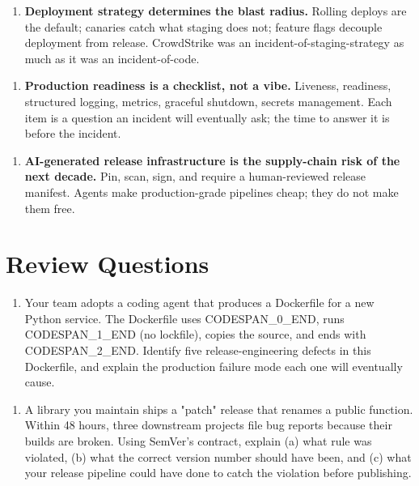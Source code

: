\documentclass[11pt,a4paper]{book}
\begin{document}
\begin{enumerate}
  \item \textbf{Deployment strategy determines the blast radius.} Rolling deploys are the default; canaries catch what staging does not; feature flags decouple deployment from release. CrowdStrike was an incident-of-staging-strategy as much as it was an incident-of-code.
\end{enumerate}

\begin{enumerate}
  \item \textbf{Production readiness is a checklist, not a vibe.} Liveness, readiness, structured logging, metrics, graceful shutdown, secrets management. Each item is a question an incident will eventually ask; the time to answer it is before the incident.
\end{enumerate}

\begin{enumerate}
  \item \textbf{AI-generated release infrastructure is the supply-chain risk of the next decade.} Pin, scan, sign, and require a human-reviewed release manifest. Agents make production-grade pipelines cheap; they do not make them free.
\end{enumerate}

\medskip

\section{Review Questions}

\begin{enumerate}
  \item Your team adopts a coding agent that produces a Dockerfile for a new Python service. The Dockerfile uses CODESPAN\_0\_END, runs CODESPAN\_1\_END (no lockfile), copies the source, and ends with CODESPAN\_2\_END. Identify five release-engineering defects in this Dockerfile, and explain the production failure mode each one will eventually cause.
\end{enumerate}

\begin{enumerate}
  \item A library you maintain ships a "patch" release that renames a public function. Within 48 hours, three downstream projects file bug reports because their builds are broken. Using SemVer's contract, explain (a) what rule was violated, (b) what the correct version number should have been, and (c) what your release pipeline could have done to catch the violation before publishing.
\end{enumerate}
\end{document}
